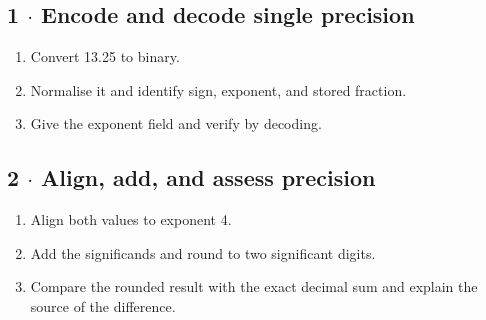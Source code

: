 \documentclass[11pt]{article}
\begin{document}
\begin{keepsection}
\begin{keepsection}
\subsection{1 \ensuremath{\cdot} Encode and decode single precision}

\begin{enumerate}
\item Convert 13.25 to binary.
\item Normalise it and identify sign, exponent, and stored fraction.
\item Give the exponent field and verify by decoding.
\end{enumerate}

\end{keepsection}

\begin{keepsection}
\subsection{2 \ensuremath{\cdot} Align, add, and assess precision}

\begin{enumerate}
\item Align both values to exponent 4.
\item Add the significands and round to two significant digits.
\item Compare the rounded result with the exact decimal sum and explain the source of the difference.
\end{enumerate}

\end{keepsection}
\end{keepsection}
\end{document}

